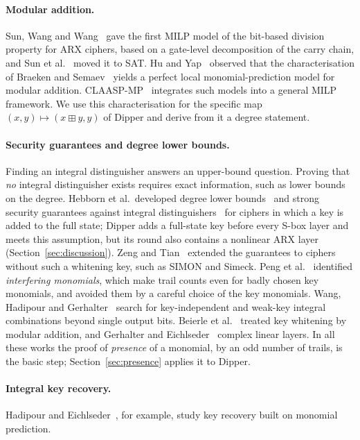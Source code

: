 \documentclass[11pt,a4paper]{article}
\theoremstyle{definition}
\theoremstyle{remark}
\newcommand{\add}{\boxplus}
\begin{document}
\paragraph{Modular addition.} Sun, Wang and Wang~\cite{sun2016arx} gave the first MILP model of the bit-based division property for ARX ciphers, based on a gate-level decomposition of the carry chain, and Sun et al.~\cite{sun2017sat} moved it to SAT. Hu and Yap~\cite{huyap2024} observed that the characterisation of Braeken and Semaev~\cite{braeken2005} yields a perfect local monomial-prediction model for modular addition. CLAASP-MP~\cite{bellini2026claaspmp} integrates such models into a general MILP framework. We use this characterisation for the specific map $(x,y)\mapsto(x\add y,y)$ of Dipper and derive from it a degree statement.

\paragraph{Security guarantees and degree lower bounds.} Finding an integral distinguisher answers an upper-bound question. Proving that \emph{no} integral distinguisher exists requires exact information, such as lower bounds on the degree. Hebborn et al.\ developed degree lower bounds~\cite{hebborn2020} and strong security guarantees against integral distinguishers~\cite{hebborn2021} for ciphers in which a key is added to the full state; Dipper adds a full-state key before every S-box layer and meets this assumption, but its round also contains a nonlinear ARX layer (Section~\ref{sec:discussion}). Zeng and Tian~\cite{zeng2024} extended the guarantees to ciphers without such a whitening key, such as SIMON and Simeck. Peng et al.~\cite{peng2026} identified \emph{interfering monomials}, which make trail counts even for badly chosen key monomials, and avoided them by a careful choice of the key monomials. Wang, Hadipour and Gerhalter~\cite{wang2026split} search for key-independent and weak-key integral combinations beyond single output bits. Beierle et al.~\cite{beierle2025} treated key whitening by modular addition, and Gerhalter and Eichlseder~\cite{gerhalter2026} complex linear layers. In all these works the proof of \emph{presence} of a monomial, by an odd number of trails, is the basic step; Section~\ref{sec:presence} applies it to Dipper.

\paragraph{Integral key recovery.} Hadipour and Eichlseder~\cite{hadipour2022}, for example, study key recovery built on monomial prediction.
\end{document}
